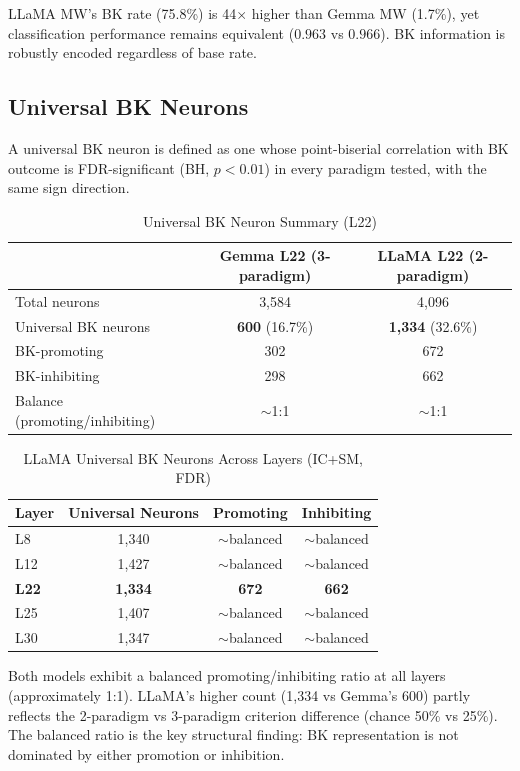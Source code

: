 \documentclass[11pt,a4paper]{article}
\begin{document}
\noindent LLaMA MW's BK rate (75.8\%) is 44$\times$ higher than Gemma MW (1.7\%), yet classification performance remains equivalent ($0.963$ vs $0.966$). BK information is robustly encoded regardless of base rate.

\subsection{Universal BK Neurons}

A universal BK neuron is defined as one whose point-biserial correlation with BK outcome is FDR-significant (BH, $p<0.01$) in every paradigm tested, with the same sign direction.

\begin{table}[H]
\centering
\caption{Universal BK Neuron Summary (L22)}\label{tab:t4}
\footnotesize
\begin{tabular}{lcc}
\toprule
 & Gemma L22 (3-paradigm) & LLaMA L22 (2-paradigm) \\
\midrule
Total neurons & 3,584 & 4,096 \\
Universal BK neurons & \textbf{600} (16.7\%) & \textbf{1,334} (32.6\%) \\
BK-promoting & 302 & 672 \\
BK-inhibiting & 298 & 662 \\
Balance (promoting/inhibiting) & $\sim$1:1 & $\sim$1:1 \\
\bottomrule
\end{tabular}
\end{table}

\begin{table}[H]
\centering
\caption{LLaMA Universal BK Neurons Across Layers (IC+SM, FDR)}\label{tab:t5}
\footnotesize
\begin{tabular}{lccc}
\toprule
Layer & Universal Neurons & Promoting & Inhibiting \\
\midrule
L8 & 1,340 & $\sim$balanced & $\sim$balanced \\
L12 & 1,427 & $\sim$balanced & $\sim$balanced \\
\textbf{L22} & \textbf{1,334} & \textbf{672} & \textbf{662} \\
L25 & 1,407 & $\sim$balanced & $\sim$balanced \\
L30 & 1,347 & $\sim$balanced & $\sim$balanced \\
\bottomrule
\end{tabular}
\end{table}

\noindent Both models exhibit a balanced promoting/inhibiting ratio at all layers (approximately 1:1). LLaMA's higher count (1,334 vs Gemma's 600) partly reflects the 2-paradigm vs 3-paradigm criterion difference (chance 50\% vs 25\%). The balanced ratio is the key structural finding: BK representation is not dominated by either promotion or inhibition.
\end{document}

